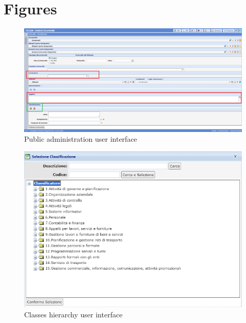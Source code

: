 \documentclass[12pt]{article}
\begin{document}
\section{Figures}
\begin{figure}[ht!]
    \begin{adjustwidth}{-3.5cm}{}
    	    \begin{center}
        \includegraphics[width=1.5\textwidth]{interface.png}
            \end{center}
    \end{adjustwidth}
    \captionsetup{justification = centering}
    \caption{Public administration user interface}
    \label{fig:interface}
\end{figure}

\begin{figure}[ht!]
    \begin{adjustwidth}{-2cm}{}
    	    \begin{center}
        \includegraphics[width=1.3\textwidth]{class_interface.png}
            \end{center}
    \end{adjustwidth}
    \captionsetup{justification = centering}
    \caption{Classes hierarchy user interface}
    \label{fig:classinterface}
\end{figure}
\end{document}
